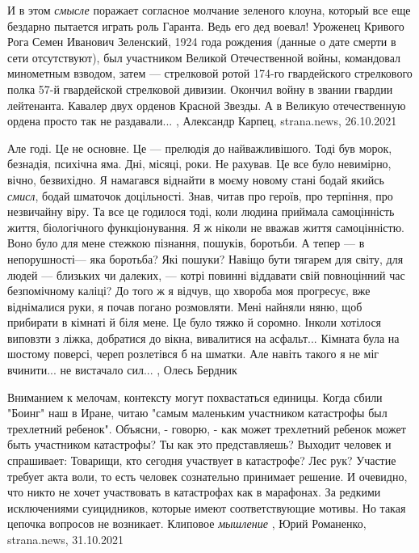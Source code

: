 И в этом \emph{смысле} поражает согласное молчание зеленого клоуна, который все еще
бездарно пытается играть роль Гаранта. Ведь его дед воевал! Уроженец Кривого
Рога Семен Иванович Зеленский, 1924 года рождения (данные о дате смерти в сети
отсутствуют), был участником Великой Отечественной войны, командовал минометным
взводом, затем — стрелковой ротой 174-го гвардейского стрелкового полка 57-й
гвардейской стрелковой дивизии. Окончил войну в звании гвардии лейтенанта.
Кавалер двух орденов Красной Звезды. А в Великую отечественную ордена просто
так не раздавали...
, 
Александр Карпец, strana.news, 26.10.2021

Але годі. Це не основне. Це — прелюдія до найважливішого. Тоді був морок,
безнадія, психічна яма. Дні, місяці, роки. Не рахував. Це все було невимірно,
вічно, безвихідно. Я намагався віднайти в моєму новому стані бодай якийсь
\emph{смисл}, бодай шматочок доцільності. Знав, читав про героїв, про терпіння, про
незвичайну віру. Та все це годилося тоді, коли людина приймала самоцінність
життя, біологічного функціонування. Я ж ніколи не вважав життя самоцінністю.
Воно було для мене стежкою пізнання, пошуків, боротьби. А тепер — в
непорушності— яка боротьба? Які пошуки? Навіщо бути тягарем для світу, для
людей — близьких чи далеких, — котрі повинні віддавати свій повноцінний час
безпомічному каліці? До того ж я відчув, що хвороба моя прогресує, вже
віднімалися руки, я почав погано розмовляти. Мені найняли няню, щоб прибирати в
кімнаті й біля мене. Це було тяжко й соромно. Інколи хотілося виповзти з ліжка,
добратися до вікна, вивалитися на асфальт... Кімната була на шостому поверсі,
череп розлетівся б на шматки. Але навіть такого я не міг вчинити... не вистачало
сил...
, Олесь Бердник

Вниманием к мелочам, контексту могут похвастаться единицы. Когда сбили "Боинг"
наш в Иране, читаю "самым маленьким участником катастрофы был трехлетний
ребенок". Объясни, - говорю, - как может трехлетний ребенок может быть
участником катастрофы? Ты как это представляешь? Выходит человек и спрашивает:
Товарищи, кто сегодня участвует в катастрофе? Лес рук? Участие требует акта
воли, то есть человек сознательно принимает решение. И очевидно, что никто не
хочет участвовать в катастрофах как в марафонах. За редкими исключениями
суицидников, которые имеют соответствующие мотивы. Но такая цепочка вопросов не
возникает. Клиповое \emph{мышление}
, 
Юрий Романенко, strana.news, 31.10.2021

